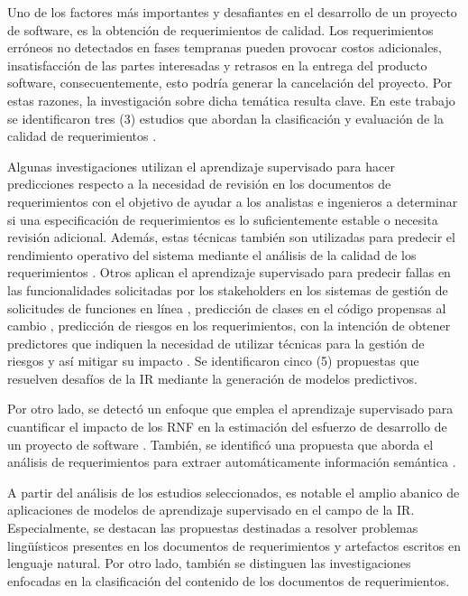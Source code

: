 \documentclass[journal]{IEEEtran}
\begin{document}
Uno de los factores más importantes y desafiantes en el desarrollo de un proyecto de software, es la obtención de requerimientos de calidad. Los requerimientos erróneos no detectados en fases tempranas pueden provocar costos adicionales, insatisfacción de las partes interesadas y retrasos en la entrega del producto software, consecuentemente, esto podría generar la cancelación del proyecto. Por estas razones, la investigación sobre dicha temática resulta clave. En este trabajo se identificaron tres (3) estudios que abordan la clasificación y evaluación de la calidad de requerimientos \cite{Parra2015180,Hayes2015,Hussain2007}. 

Algunas investigaciones utilizan el aprendizaje supervisado para hacer predicciones respecto a la necesidad de revisión en los documentos de requerimientos \cite{del2017stability} con el objetivo de ayudar a los analistas e ingenieros a determinar si una especificación de requerimientos es lo suficientemente estable o necesita revisión adicional. Además, estas técnicas también son utilizadas para predecir el rendimiento operativo del sistema mediante el análisis de la calidad de los requerimientos \cite{dargan2016systems}. Otros aplican el aprendizaje supervisado para predecir fallas en las funcionalidades solicitadas por los stakeholders en los sistemas de gestión de solicitudes de funciones en línea \cite{fitzgerald2012early}, predicción de clases en el código propensas al cambio \cite{malhotra2017exploratory}, predicción de riesgos en los requerimientos, con la intención de obtener predictores que indiquen la necesidad de utilizar técnicas para la gestión de riesgos y así mitigar su impacto \cite{del2011requirement}. Se identificaron cinco (5) propuestas que resuelven desafíos de la IR mediante la generación de modelos predictivos. 

Por otro lado, se detectó un enfoque que emplea el aprendizaje supervisado para cuantificar el impacto de los RNF en la estimación del esfuerzo de desarrollo de un proyecto de software \cite{Abdukalykov2011158}. También, se identificó una propuesta que aborda el análisis de requerimientos para extraer automáticamente información semántica \cite{Wang2016}. 

A partir del análisis de los estudios seleccionados, es notable el amplio abanico de aplicaciones de modelos de aprendizaje supervisado en el campo de la IR. Especialmente, se destacan las propuestas destinadas a resolver problemas lingüísticos presentes en los documentos de requerimientos y artefactos escritos en lenguaje natural. Por otro lado, también se distinguen las investigaciones enfocadas en la clasificación del contenido de los documentos de requerimientos.
\end{document}
